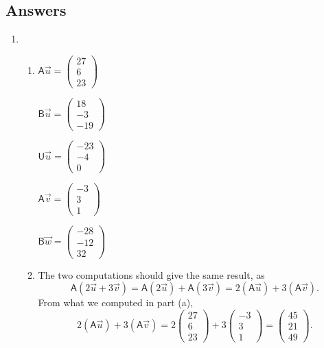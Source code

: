 \newpage
\subsection{Answers}

\begin{enumerate}
\item \begin{enumerate}
\item \begin{multicols}{2}
$\mathsf{A}\vec{u} = \begin{pmatrix} 27 \\ 6 \\ 23 \end{pmatrix}$\par
$\mathsf{B}\vec{u} = \begin{pmatrix} 18 \\ -3 \\ -19 \end{pmatrix}$\par
$\mathsf{U}\vec{u} = \begin{pmatrix} -23 \\ -4 \\ 0 \end{pmatrix}$\par
$\mathsf{A}\vec{v} = \begin{pmatrix} -3 \\ 3 \\ 1 \end{pmatrix}$\par
$\mathsf{B}\vec{w} = \begin{pmatrix} -28 \\ -12 \\ 32 \end{pmatrix}$
\end{multicols}
\item The two computations should give the same result, as
\begin{equation*}
\mathsf{A}(2\vec{u} + 3\vec{v}) = \mathsf{A}(2\vec{u}) + \mathsf{A}(3\vec{v}) = 2(\mathsf{A}\vec{u}) + 3(\mathsf{A}\vec{v}).
\end{equation*}
From what we computed in part (a),
\begin{equation*}
2(\mathsf{A}\vec{u}) + 3(\mathsf{A}\vec{v}) = 2\begin{pmatrix} 27 \\ 6 \\ 23 \end{pmatrix} + 3\begin{pmatrix} -3 \\ 3 \\ 1 \end{pmatrix} = \begin{pmatrix} 45 \\ 21 \\ 49 \end{pmatrix}.

\end{equation*}
\end{enumerate}
\end{enumerate}
